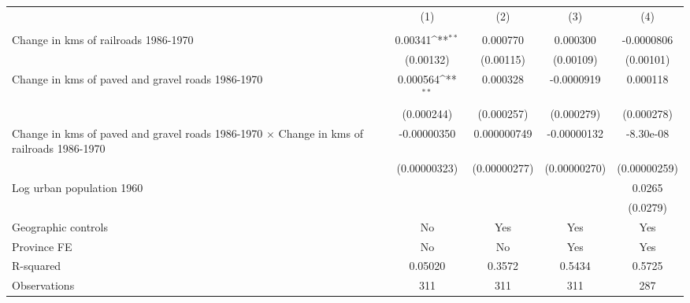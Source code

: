 {
\def\sym#1{\ifmmode^{#1}\else\(^{#1}\)\fi}
\begin{tabular}{l*{4}{c}}
\hline\hline
                &\multicolumn{1}{c}{(1)}&\multicolumn{1}{c}{(2)}&\multicolumn{1}{c}{(3)}&\multicolumn{1}{c}{(4)}\\
                &\multicolumn{1}{c}{}&\multicolumn{1}{c}{}&\multicolumn{1}{c}{}&\multicolumn{1}{c}{}\\
\hline
Change in kms of railroads 1986-1970&  0.00341\sym{**} & 0.000770         & 0.000300         &-0.0000806         \\
                &(0.00132)         &(0.00115)         &(0.00109)         &(0.00101)         \\
[1em]
Change in kms of paved and gravel roads 1986-1970& 0.000564\sym{**} & 0.000328         &-0.0000919         & 0.000118         \\
                &(0.000244)         &(0.000257)         &(0.000279)         &(0.000278)         \\
[1em]
Change in kms of paved and gravel roads 1986-1970 $\times$ Change in kms of railroads 1986-1970&-0.00000350         &0.000000749         &-0.00000132         &-8.30e-08         \\
                &(0.00000323)         &(0.00000277)         &(0.00000270)         &(0.00000259)         \\
[1em]
Log urban population 1960&                  &                  &                  &   0.0265         \\
                &                  &                  &                  & (0.0279)         \\
\hline
Geographic controls&       No         &      Yes         &      Yes         &      Yes         \\
Province FE     &       No         &       No         &      Yes         &      Yes         \\
R-squared       &  0.05020         &   0.3572         &   0.5434         &   0.5725         \\
Observations    &      311         &      311         &      311         &      287         \\
\hline\hline
\end{tabular}
}
